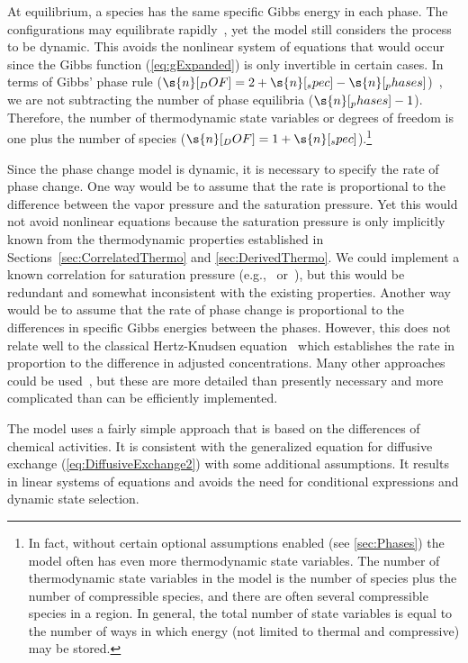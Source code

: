 At equilibrium, a species has the same specific Gibbs energy in each phase.  The configurations may equilibrate rapidly~\cite{Oh1996}, yet the model still considers the process to be dynamic.  This avoids the nonlinear system of equations that would occur since the Gibbs function (\autoref{eq:gExpanded}) is only invertible in certain cases.  In terms of Gibbs' phase rule\label{mark:Gibbs} ($\s{n}[_DOF] = 2 + \s{n}[_spec] - \s{n}[_phases]$)~\cite{Moran2004, Bejan2006}, %
we are not subtracting the number of phase equilibria ($\s{n}[_phases] - 1$).  Therefore, the number of thermodynamic state variables or degrees of freedom is one plus the number of species ($\s{n}[_DOF] = 1 + \s{n}[_spec]$).\footnote{In fact, without certain optional assumptions enabled (see \autoref{sec:Phases}) the model often has even more thermodynamic state variables.  The number of thermodynamic state variables in the model is the number of species plus the number of compressible species, and there are often several compressible species in a region.  In general, the total number of state variables is equal to the number of ways in which energy (not limited to thermal and compressive) may be stored.}

Since the phase change model is dynamic, it is necessary to specify the rate of phase change.  One way would be to assume that the rate is proportional to the difference between the vapor pressure and the saturation pressure.  Yet this would not avoid nonlinear equations because the saturation pressure is only implicitly known from the thermodynamic properties established in Sections~\ref{sec:CorrelatedThermo} and \ref{sec:DerivedThermo}.  We could implement a known correlation for saturation pressure (e.g.,~\cite{Springer1991} or~\cite{ModelicaSL3.2}), but this would be redundant and somewhat inconsistent with the existing properties.  Another way would be to assume that the rate of phase change is proportional to the differences in specific Gibbs energies between the phases.  However, this does not relate well to the classical Hertz-Knudsen equation~\cite{Ytrehus1997} which establishes the rate in proportion to the difference in adjusted concentrations.  Many other approaches could be used~\cite{Bedeaux2003}, but these are more detailed than presently necessary and more complicated than can be efficiently implemented.

The model uses a fairly simple approach that is based on the differences of chemical activities.  It is consistent with the generalized equation for diffusive exchange (\ref{eq:DiffusiveExchange2}) with some additional assumptions.  It results in linear systems of equations and avoids the need for conditional expressions and dynamic state selection.


